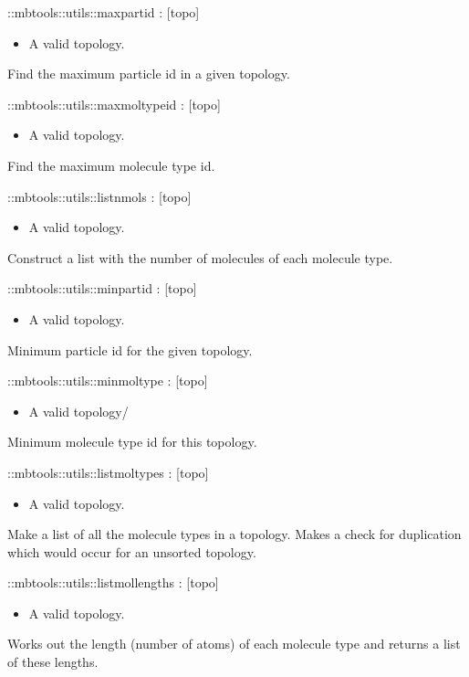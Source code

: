 \begin{code}
  ::mbtools::utils::maxpartid  :  [topo]
\end{code}
\begin{itemize}
\item {} A valid topology.
\end{itemize}
Find the maximum particle id in a given topology.
\begin{code}
  ::mbtools::utils::maxmoltypeid : [topo]
\end{code}
\begin{itemize}
\item {} A valid topology.
\end{itemize}
Find the maximum molecule type id.
\begin{code}
  ::mbtools::utils::listnmols : [topo]
\end{code}
\begin{itemize}
\item {} A valid topology.
\end{itemize}
Construct a list with the number of molecules of each molecule type.
\begin{code}
  ::mbtools::utils::minpartid : [topo]
\end{code}
\begin{itemize}
\item {} A valid topology.
\end{itemize}
Minimum particle id for the given topology.
\begin{code}
  ::mbtools::utils::minmoltype : [topo]
\end{code}
\begin{itemize}
          \item {} A valid topology/
\end{itemize}
Minimum molecule type id for this topology.
\begin{code}
  ::mbtools::utils::listmoltypes : [topo]
\end{code}
\begin{itemize}
\item {} A valid topology.
\end{itemize}
Make a list of all the molecule types in a topology. Makes a check for
duplication which would occur for an unsorted topology.
\begin{code}
  ::mbtools::utils::listmollengths : [topo]
\end{code}
\begin{itemize}
\item {} A valid topology.
\end{itemize}
Works out the length (number of atoms) of each molecule type and
returns a list of these lengths.

